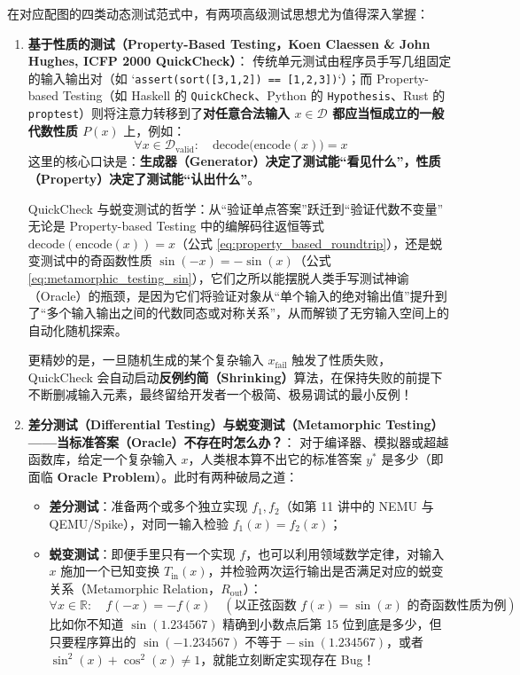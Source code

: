 \documentclass[a4paper]{article}
\begin{document}
在对应配图的四类动态测试范式中，有两项高级测试思想尤为值得深入掌握：
\begin{enumerate}
    \item \textbf{基于性质的测试（Property-Based Testing，Koen Claessen \& John Hughes, ICFP 2000 QuickCheck）}：
    传统单元测试由程序员手写几组固定的输入输出对（如 `\texttt{assert(sort([3,1,2]) == [1,2,3])}`）；而 Property-based Testing（如 Haskell 的 \texttt{QuickCheck}、Python 的 \texttt{Hypothesis}、Rust 的 \texttt{proptest}）则将注意力转移到了\textbf{对任意合法输入 $x \in \mathcal{D}$ 都应当恒成立的一般代数性质 $P(x)$} 上，例如：
    \begin{equation}
    \forall x \in \mathcal{D}_{\text{valid}}:\quad \mathrm{decode}\big(\mathrm{encode}(x)\big) = x
    \label{eq:property_based_roundtrip}
    \end{equation}
    这里的核心口诀是：\textbf{生成器（Generator）决定了测试能“看见什么”，性质（Property）决定了测试能“认出什么”}。\begin{knowledgebox}{QuickCheck 与蜕变测试的哲学：从“验证单点答案”跃迁到“验证代数不变量”}
无论是 Property-based Testing 中的编解码往返恒等式 $\mathrm{decode}(\mathrm{encode}(x)) = x$（公式 \eqref{eq:property_based_roundtrip}），还是蜕变测试中的奇函数性质 $\sin(-x) = -\sin(x)$（公式 \eqref{eq:metamorphic_testing_sin}），它们之所以能摆脱人类手写测试神谕（Oracle）的瓶颈，是因为它们将验证对象从“单个输入的绝对输出值”提升到了“多个输入输出之间的代数同态或对称关系”，从而解锁了无穷输入空间上的自动化随机探索。
\end{knowledgebox}

更精妙的是，一旦随机生成的某个复杂输入 $x_{\text{fail}}$ 触发了性质失败，QuickCheck 会自动启动\textbf{反例约简（Shrinking）}算法，在保持失败的前提下不断删减输入元素，最终留给开发者一个极简、极易调试的最小反例！
    \item \textbf{差分测试（Differential Testing）与蜕变测试（Metamorphic Testing）——当标准答案（Oracle）不存在时怎么办？}：
    对于编译器、模拟器或超越函数库，给定一个复杂输入 $x$，人类根本算不出它的标准答案 $y^*$ 是多少（即面临 \textbf{Oracle Problem}）。此时有两种破局之道：
    \begin{itemize}
        \item \textbf{差分测试}：准备两个或多个独立实现 $f_1, f_2$（如第 11 讲中的 NEMU 与 QEMU/Spike），对同一输入检验 $f_1(x) = f_2(x)$；
        \item \textbf{蜕变测试}：即便手里只有一个实现 $f$，也可以利用领域数学定律，对输入 $x$ 施加一个已知变换 $T_{\text{in}}(x)$，并检验两次运行输出是否满足对应的蜕变关系（Metamorphic Relation，$R_{\text{out}}$）：
        \begin{equation}
        \forall x \in \mathbb{R}:\quad f(-x) = -f(x) \quad (\text{以正弦函数 } f(x) = \sin(x) \text{ 的奇函数性质为例})
        \label{eq:metamorphic_testing_sin}
        \end{equation}
        比如你不知道 $\sin(1.234567)$ 精确到小数点后第 15 位到底是多少，但只要程序算出的 $\sin(-1.234567)$ 不等于 $-\sin(1.234567)$，或者 $\sin^2(x) + \cos^2(x) \neq 1$，就能立刻断定实现存在 Bug！
    \end{itemize}
\end{enumerate}
\end{document}

